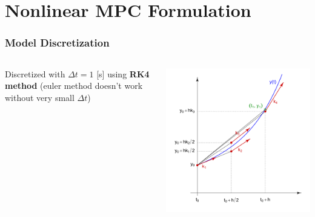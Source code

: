 \documentclass[aspectratio=169]{beamer}
\begin{document}
\section{Nonlinear MPC Formulation}
\begin{frame}
	\frametitle{Model Discretization\cite{rk4}}
	\begin{columns}
		\begin{column}{0.6\textwidth}
			Discretized with $\Delta t = 1$ [s] using \textbf{RK4 method} 
			(euler method doesn't work without very small $\Delta t$) 
		\end{column}
		\begin{column}{0.4\textwidth}
			\includegraphics[width=\columnwidth]{figs/rk4_method.png}
		\end{column}
	\end{columns}
\end{frame}
\end{document}
